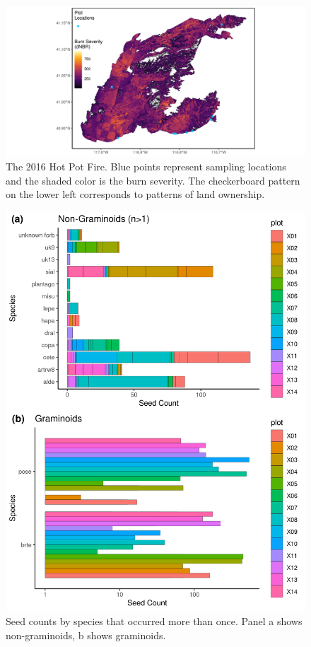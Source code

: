 \documentclass[
  12pt,
]{article}
\begin{document}
\newpage

\begin{figure}
\centering
\includegraphics{images/map.png}
\caption{The 2016 Hot Pot Fire. Blue points represent sampling locations
and the shaded color is the burn severity. The checkerboard pattern on
the lower left corresponds to patterns of land ownership.}
\end{figure}

\newpage

\begin{figure}
\centering
\includegraphics{images/seed_counts.png}
\caption{Seed counts by species that occurred more than once. Panel a
shows non-graminoids, b shows graminoids.}
\end{figure}
\end{document}
